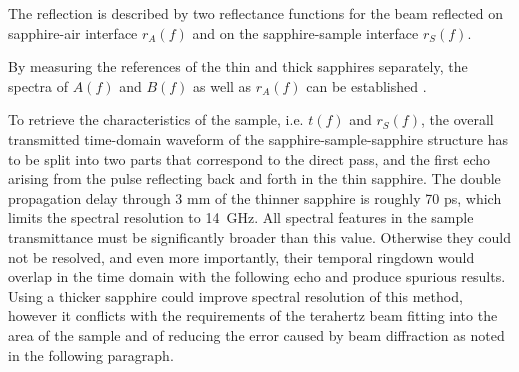 The reflection is described by two reflectance functions for the beam reflected on sapphire-air interface $r_{A}(f)$ and on the sapphire-sample interface $r_S(f)$.

By measuring the references of the thin and thick sapphires separately, the spectra of $A(f)$ and $B(f)$ as well as $r_{A}(f)$ can be established \cite{nemec2012resonant}. 


To retrieve the characteristics of the sample, i.e. $t(f)$ and $r_S(f)$, the overall transmitted time-domain waveform of the sapphire-sample-sapphire structure has to be split into two parts that correspond to the direct pass, and the first echo arising from the pulse reflecting back and forth  in the thin sapphire.
The double propagation delay through 3 mm of the thinner sapphire is roughly 70 ps, which limits the spectral resolution to 14~GHz. All spectral features in the sample transmittance must be significantly broader than this value. Otherwise they could not be resolved, and even more importantly, their temporal ringdown would overlap in the time domain with the following echo and produce spurious results. Using a thicker sapphire could improve spectral resolution of this method, however it conflicts with the requirements of the terahertz beam fitting into the area of the sample \cite{nemec2009tunable} and of reducing the error caused by beam diffraction as noted in the following paragraph.

